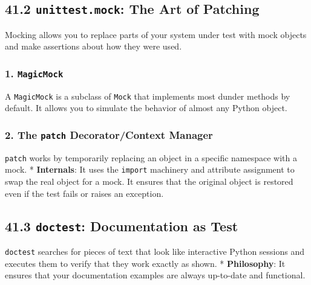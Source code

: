 \hypertarget{unittest.mock-the-art-of-patching}{%
\subsection{\texorpdfstring{41.2 \texttt{unittest.mock}: The Art of
Patching}{41.2 unittest.mock: The Art of Patching}}\label{unittest.mock-the-art-of-patching}}

Mocking allows you to replace parts of your system under test with mock
objects and make assertions about how they were used.

\hypertarget{magicmock}{%
\subsubsection{\texorpdfstring{1.
\texttt{MagicMock}}{1. MagicMock}}\label{magicmock}}

A \passthrough{\lstinline!MagicMock!} is a subclass of
\passthrough{\lstinline!Mock!} that implements most dunder methods by
default. It allows you to simulate the behavior of almost any Python
object.

\hypertarget{the-patch-decoratorcontext-manager}{%
\subsubsection{\texorpdfstring{2. The \texttt{patch} Decorator/Context
Manager}{2. The patch Decorator/Context Manager}}\label{the-patch-decoratorcontext-manager}}

\passthrough{\lstinline!patch!} works by temporarily replacing an object
in a specific namespace with a mock. * \textbf{Internals}: It uses the
\passthrough{\lstinline!import!} machinery and attribute assignment to
swap the real object for a mock. It ensures that the original object is
restored even if the test fails or raises an exception.

\hypertarget{doctest-documentation-as-test}{%
\subsection{\texorpdfstring{41.3 \texttt{doctest}: Documentation as
Test}{41.3 doctest: Documentation as Test}}\label{doctest-documentation-as-test}}

\passthrough{\lstinline!doctest!} searches for pieces of text that look
like interactive Python sessions and executes them to verify that they
work exactly as shown. * \textbf{Philosophy}: It ensures that your
documentation examples are always up-to-date and functional.

